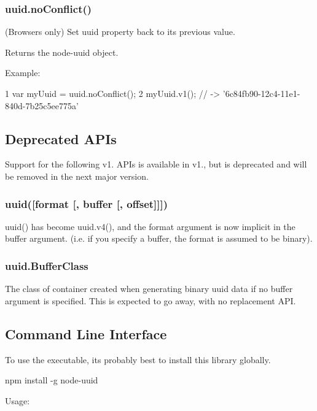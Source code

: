 \subsubsection*{uuid.\+no\+Conflict()}

(Browsers only) Set {\ttfamily uuid} property back to it\textquotesingle{}s previous value.

Returns the node-\/uuid object.

Example\+:


\begin{DoxyCode}
1 var myUuid = uuid.noConflict();
2 myUuid.v1(); // -> '6c84fb90-12c4-11e1-840d-7b25c5ee775a'
\end{DoxyCode}


\subsection*{Deprecated A\+P\+Is}

Support for the following v1. A\+P\+Is is available in v1., but is deprecated and will be removed in the next major version.

\subsubsection*{uuid(\mbox{[}format \mbox{[}, buffer \mbox{[}, offset\mbox{]}\mbox{]}\mbox{]})}

uuid() has become uuid.\+v4(), and the {\ttfamily format} argument is now implicit in the {\ttfamily buffer} argument. (i.\+e. if you specify a buffer, the format is assumed to be binary).

\subsubsection*{uuid.\+Buffer\+Class}

The class of container created when generating binary uuid data if no buffer argument is specified. This is expected to go away, with no replacement A\+P\+I.

\subsection*{Command Line Interface}

To use the executable, it\textquotesingle{}s probably best to install this library globally.

{\ttfamily npm install -\/g node-\/uuid}

Usage\+:


